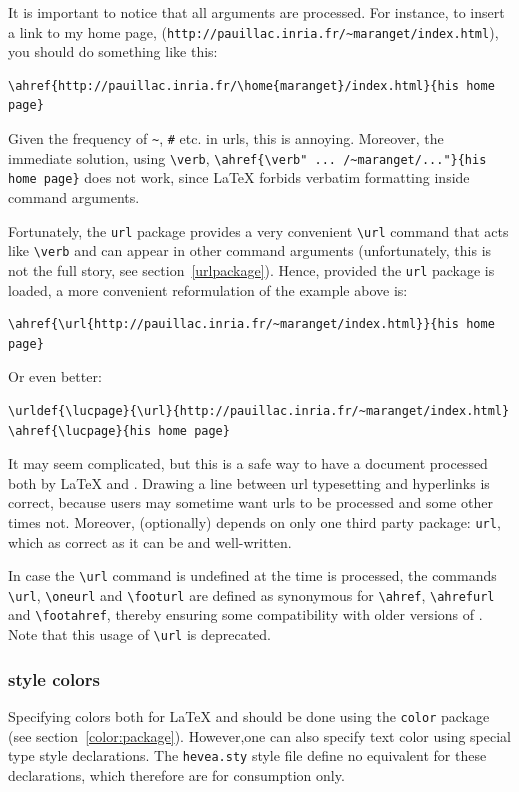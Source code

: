 \label{urlareprocessed}It is important to notice that all arguments
are processed.
For instance, to insert a link to
my home page, (\verb+http://pauillac.inria.fr/~maranget/index.html+),
you should do something like this:
\begin{verbatim}
\ahref{http://pauillac.inria.fr/\home{maranget}/index.html}{his home page}
\end{verbatim}

Given the frequency of \verb+~+, \verb+#+ etc. in urls,
this is annoying. Moreover, the immediate solution, using \verb+\verb+,
\verb+\ahref{\verb" ... /~maranget/..."}{his home page}+ does not
work, since \LaTeX{} forbids verbatim formatting inside command arguments.

Fortunately, the \texttt{url} package provides a very convenient
\verb+\url+ command that acts like \verb+\verb+ and can appear in
other command arguments
(unfortunately, this is not the full story, see section~\ref{urlpackage}).
Hence, provided the \texttt{url} package is loaded,
a more convenient reformulation of the example above is:
\begin{verbatim}
\ahref{\url{http://pauillac.inria.fr/~maranget/index.html}}{his home page}
\end{verbatim}
Or even better:
\begin{verbatim}
\urldef{\lucpage}{\url}{http://pauillac.inria.fr/~maranget/index.html}
\ahref{\lucpage}{his home page}
\end{verbatim}
It may seem complicated, but this is a safe way to have a
document processed both by \LaTeX{} and \hevea{}.
Drawing a line between url typesetting and hyperlinks is correct,
because users may sometime want urls to be processed and some other
times not.
Moreover, \hevea{} (optionally) depends on only one third party package:
\texttt{url}, which as correct as it can be and well-written.



In case the \verb+\url+ command is undefined
at the time \verb++ is processed, the commands
\verb+\url+, \verb+\oneurl+ and \verb+\footurl+ are defined as
synonymous for
\verb+\ahref+, \verb+\ahrefurl+ and \verb+\footahref+, thereby
ensuring
some compatibility with older versions of \hevea.
Note that this usage of \verb+\url+ is deprecated.

\subsubsection{\html{} style colors}\label{color:high}
Specifying colors both for \LaTeX{} and
\hevea{} should be done using the \texttt{color} package (see
section~\ref{color:package}).
However,one can also specify text color using special type style declarations.
The \texttt{hevea.sty} style file
define no equivalent for these declarations, which therefore are for
\hevea{} consumption only.

